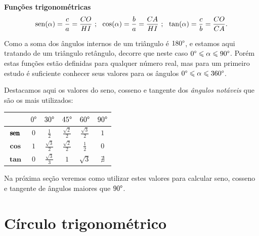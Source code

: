 \colorbox{azul}{
 \begin{minipage}{0.9\linewidth}
 \begin{center}
 \textbf{Funções trigonométricas}
  \begin{eqnarray*}
   \operatorname{sen}(\alpha)= \frac{c}{a}= \frac{CO}{HI} \ ; \ \
   \cos(\alpha)= \frac{b}{a}= \frac{CA}{HI} \ ; \ \
   \tan(\alpha)= \frac{c}{b}= \frac{CO}{CA}.
 \end{eqnarray*}
 \end{center}
 \end{minipage}}

 \vskip0.3cm

 Como a soma dos ângulos internos de um triângulo é $180 \degree$, e estamos aqui tratando de um triângulo retângulo, decorre que neste caso $0 \degree \leqslant \alpha \leqslant 90 \degree$. Porém estas funções estão definidas para qualquer número real, mas para um primeiro estudo é suficiente conhecer seus valores para os ângulos $0 \degree \leqslant \alpha \leqslant 360 \degree$.

 Destacamos aqui os valores do seno, cosseno e tangente dos \emph{ângulos notáveis} que são os mais utilizados:

 \begin{table}[H]
 \centering
 \begin{tabular}{|c|c|c|c|c|c|} \hline
 \rowcolor{cinza}
               & $0 \degree$  & $30 \degree$  & $45 \degree$  & $60 \degree$ & $90 \degree$  \\\hline
  $\pmb{\operatorname{sen}}$ & $0$ &$\frac{1}{2}$ & $\frac{\sqrt{2}}{2}$ & $\frac{\sqrt{3}}{2}$ & $1$ \\\hline
  $\pmb{\cos}$ & $1$ & $\frac{\sqrt{3}}{2}$ & $\frac{\sqrt{2}}{2}$ & $\frac{1}{2}$ & $0$ \\\hline
  $\pmb{\tan}$ & $0$ & $\frac{\sqrt{3}}{3}$ & $1$ & $\sqrt{3}$ & $\nexists$ \\\hline
 \end{tabular}
\end{table}
 Na próxima seção veremos como utilizar estes valores para calcular seno, cosseno e tangente de ângulos maiores que $90 \degree$.

\section{Círculo trigonométrico}

